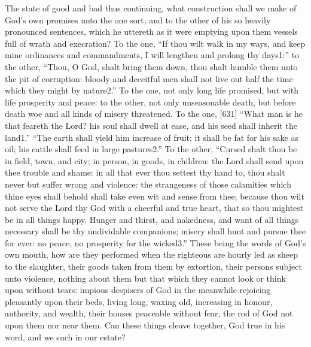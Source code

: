 The state of good and bad thus continuing, what construction shall we make of God’s own promises unto the one sort, and to the other of his so heavily pronounced sentences, which he uttereth as it were emptying upon them vessels full of wrath and execration? To the one, “If thou wilt walk in my ways, and keep mine ordinances and commandments, I will lengthen and prolong thy days1:” to the other, “Thou, O God, shalt bring them down, thou shalt humble them unto the pit of corruption: bloody and deceitful men shall not live out half the time which they might by nature2.” To the one, not only long life promised, but with life prosperity and peace: to the other, not only unseasonable death, but before death woe and all kinds of misery threatened. To the one, [631] “What man is he that feareth the Lord? his soul shall dwell at ease, and his seed shall inherit the land1.” “The earth shall yield him increase of fruit; it shall be fat for his sake as oil; his cattle shall feed in large pastures2.” To the other, “Cursed shalt thou be in field, town, and city; in person, in goods, in children: the Lord shall send upon thee trouble and shame: in all that ever thou settest thy hand to, thou shalt never but suffer wrong and violence: the strangeness of those calamities which thine eyes shall behold shall take even wit and sense from thee; because thou wilt not serve the Lord thy God with a cheerful and true heart, that so thou mightest be in all things happy. Hunger and thirst, and nakedness, and want of all things necessary shall be thy undividable companions; misery shall hunt and pursue thee for ever: no peace, no prosperity for the wicked3.” These being the words of God’s own mouth, how are they performed when the righteous are hourly led as sheep to the slaughter, their goods taken from them by extortion, their persons subject unto violence, nothing about them but that which they cannot look or think upon without tears: impious despisers of God in the meanwhile rejoicing pleasantly upon their beds, living long, waxing old, increasing in honour, authority, and wealth, their houses peaceable without fear, the rod of God not upon them nor near them. Can these things cleave together, God true in his word, and we such in our estate?

